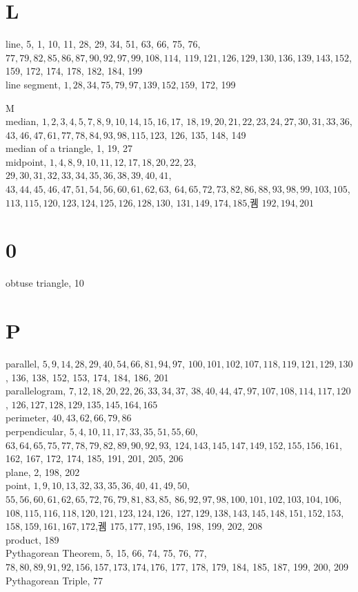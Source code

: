 \documentclass[10pt]{article}
\begin{document}
\section*{L}
line, 5, 1, 10, 11, 28, 29, 34, 51, 63, 66, 75, 76, \(77,79,82,85,86,87,90,92,97,99,108,114\), \(119,121,126,129,130,136,139,143,152\), 159, 172, 174, 178, 182, 184, 199\\
line segment, \(1,28,34,75,79,97,139,152,159\), 172, 199

M\\
median, \(1,2,3,4,5,7,8,9,10,14,15,16,17\), \(18,19,20,21,22,23,24,27,30,31,33,36\), \(43,46,47,61,77,78,84,93,98,115,123\), 126, 135, 148, 149\\
median of a triangle, 1, 19, 27\\
midpoint, \(1,4,8,9,10,11,12,17,18,20,22,23\), \(29,30,31,32,33,34,35,36,38,39,40,41\),\\
\(43,44,45,46,47,51,54,56,60,61,62,63\), \(64,65,72,73,82,86,88,93,98,99,103,105\), \(113,115,120,123,124,125,126,128,130\), \(131,149,174,185\),궴 \(192,194,201\)

\section*{0}
obtuse triangle, 10

\section*{P}
parallel, \(5,9,14,28,29,40,54,66,81,94,97\), \(100,101,102,107,118,119,121,129,130\), 136, 138, 152, 153, 174, 184, 186, 201\\
parallelogram, \(7,12,18,20,22,26,33,34,37\), \(38,40,44,47,97,107,108,114,117,120\), \(126,127,128,129,135,145,164,165\)\\
perimeter, \(40,43,62,66,79,86\)\\
perpendicular, \(5,4,10,11,17,33,35,51,55,60\), \(63,64,65,75,77,78,79,82,89,90,92,93\), \(124,143,145,147,149,152,155,156,161\), 162, 167, 172, 174, 185, 191, 201, 205, 206\\
plane, 2, 198, 202\\
point, \(1,9,10,13,32,33,35,36,40,41,49,50\), \(55,56,60,61,62,65,72,76,79,81,83,85\), \(86,92,97,98,100,101,102,103,104,106\), \(108,115,116,118,120,121,123,124,126\), \(127,129,138,143,145,148,151,152,153\), \(158,159,161,167,172\),궴 \(175,177,195,196\), 198, 199, 202, 208\\
product, 189\\
Pythagorean Theorem, 5, 15, 66, 74, 75, 76, 77, \(78,80,89,91,92,156,157,173,174,176\), 177, 178, 179, 184, 185, 187, 199, 200, 209\\
Pythagorean Triple, 77
\end{document}
